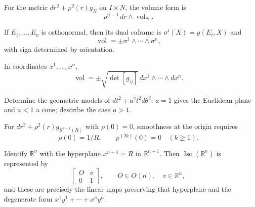 \begin{remark}
  \label{rem:pet-ch1-ex-4}
  \leanok
  For the metric $dr^2+\rho^2(r)g_N$ on $I\times N$, the volume form is
  \[
    \rho^{n-1}\,dr\wedge\operatorname{vol}_N.
  \]
\end{remark}

\begin{remark}
  \label{rem:pet-ch1-ex-5}
  \leanok
  If $E_1,\ldots,E_n$ is orthonormal, then its dual coframe is
  $\sigma^i(X)=g(E_i,X)$ and
  \[
    \operatorname{vol}=\pm\sigma^1\wedge\cdots\wedge\sigma^n,
  \]
  with sign determined by orientation.
\end{remark}

\begin{remark}
  \label{rem:pet-ch1-ex-6}
  \leanok
  In coordinates $x^1,\ldots,x^n$,
  \[
    \operatorname{vol}
      =\pm\sqrt{\det[g_{ij}]}\,dx^1\wedge\cdots\wedge dx^n.
  \]
\end{remark}

\begin{remark}
  \label{rem:pet-ch1-ex-7}
  \leanok
  Determine the geometric models of
  $dt^2+a^2t^2d\theta^2$: $a=1$ gives the Euclidean plane and $a<1$ a cone;
  describe the case $a>1$.
\end{remark}

\begin{remark}
  \label{rem:pet-ch1-ex-8}
  \leanok
  For
  $dr^2+\rho^2(r)g_{S^{n-1}(R)}$ with $\rho(0)=0$, smoothness at the origin
  requires
  \[
    \dot\rho(0)=1/R,
    \qquad \rho^{(2k)}(0)=0\quad(k\ge1).
  \]
\end{remark}

\begin{remark}
  \label{rem:pet-ch1-ex-9}
  \leanok
  Identify $\mathbb{R}^n$ with the hyperplane $x^{n+1}=R$ in
  $\mathbb{R}^{n+1}$. Then $\operatorname{Iso}(\mathbb{R}^n)$ is represented by
  \[
    \left[\begin{smallmatrix}O&v\\0&1\end{smallmatrix}\right],
    \qquad O\in O(n),\quad v\in\mathbb{R}^n,
  \]
  and these are precisely the linear maps preserving that hyperplane and the
  degenerate form $x^1y^1+\cdots+x^ny^n$.
\end{remark}


